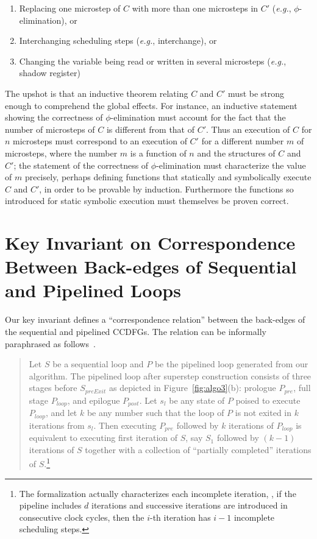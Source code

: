 \begin{enumerate}
\item Replacing one microstep of $C$ with more than one
  microsteps in $C'$ ({\em e.g.}, $\phi$-elimination), or
\item Interchanging scheduling steps ({\em e.g.},
  interchange), or
\item Changing the variable being read or written in several
  microsteps ({\em e.g.}, shadow register)
\end{enumerate}
The upshot is that an inductive theorem relating $C$ and
$C'$ must be strong enough to comprehend the global effects.
For instance, an inductive statement showing the
correctness of $\phi$-elimination must account for the fact
that the number of microsteps of $C$ is different from that
of $C'$.  Thus an execution of $C$ for $n$ microsteps must
correspond to an execution of $C'$ for a different number
$m$ of microsteps, where the number $m$ is a function of $n$
and the structures of $C$ and $C'$; the statement of the
correctness of $\phi$-elimination must characterize the
value of $m$ precisely, perhaps defining functions that
statically and symbolically execute $C$ and $C'$, in order
to be provable by induction.  Furthermore the functions so
introduced for static symbolic execution must themselves be
proven correct.


\section{Key Invariant on Correspondence Between Back-edges of Sequential and Pipelined Loops}
 Our key invariant defines a ``correspondence relation''
between the back-edges of the sequential and pipelined CCDFGs.
The relation can be informally paraphrased as
follows~\cite{disha-itp14}.

\begin{quote}
Let $S$ be a sequential loop and $P$ be the pipelined loop
generated from our algorithm. The pipelined loop after superstep construction
consists of
three stages before $S_{preExit}$ as depicted in
Figure~\ref{fig:algo3}(b): prologue $P_{pre}$, full stage
$P_{loop}$, and epilogue $P_{post}$.  Let $s_l$ be any state of $P$
poised to execute $P_{loop}$, and let $k$ be any number such that
the loop of $P$ is not exited in $k$ iterations from $s_l$.
Then executing $P_{pre}$ followed by $k$ iterations of $P_{loop}$ is
equivalent to executing first iteration of $S$, say $S_1$
followed by $(k - 1)$ iterations of $S$ together with a
collection of ``partially completed'' iterations of
$S$.\footnote{The formalization actually characterizes each
  incomplete iteration, \eg, if the pipeline includes $d$
  iterations and successive iterations are introduced in
  consecutive clock cycles, then the $i$-th iteration has $i
  - 1$ incomplete scheduling steps.}
\end{quote}

